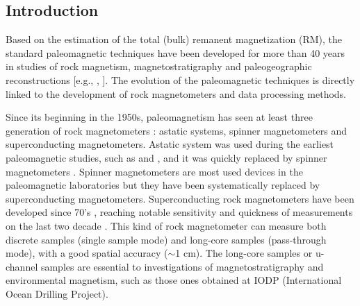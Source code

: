 \documentclass[draft,gc]{agutex}
\begin{document}
%


\begin{article}




\section{Introduction}
\label{sec:Introduction}

Based on the estimation of the total (bulk) remanent magnetization (RM), 
the standard paleomagnetic techniques have been developed for more than 
40 years in studies of rock magnetism, magnetostratigraphy and 
paleogeographic reconstructions [e.g., \citeauthor{voo1993}, \citeyear{voo1993}]. 
The evolution of the paleomagnetic techniques is directly linked to 
the development of rock magnetometers and data processing methods. 

Since its beginning in the 1950s, 
paleomagnetism has seen at least three generation of rock magnetometers 
\citep{turner2015}: astatic systems, 
spinner magnetometers and superconducting magnetometers. 
Astatic system was used during the earliest paleomagnetic studies, 
such as \citet{blackett1952} and \citet{pozzi-thellier1963},
and it was quickly replaced by spinner magnetometers \citep{nagata1961}. 
Spinner magnetometers are most used devices in the paleomagnetic 
laboratories but they have been systematically replaced by 
superconducting magnetometers. Superconducting rock magnetometers 
have been developed since 70’s \citep{dodson1974, goree-fuller1976}, 
reaching notable sensitivity and quickness of measurements on the last two decade 
\citep{kirschvink2015}. 
This kind of rock magnetometer can measure both discrete samples 
(single sample mode) and long-core samples (pass-through mode), 
with a good spatial accuracy ($\sim$1 cm).
The long-core samples or u-channel samples are essential to 
investigations of magnetostratigraphy and environmental magnetism, 
such as those ones obtained at IODP (International Ocean Drilling Project). 


\end{article}
\end{document}
